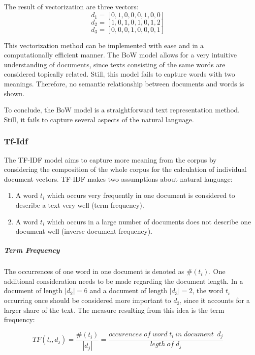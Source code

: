             The result of vectorization are three vectors:
            \[ d_{1} = [0,1,0,0,0,1,0,0] \]
            \[ d_{2} = [1,0,1,0,1,0,1,2] \]	
            \[ d_{3} = [0,0,0,1,0,0,0,1]\]
    
    
            This vectorization method can be implemented with ease and in a computationally efficient manner. The \ac{BoW} model allows for a very intuitive understanding of documents, since texts consisting of the same words are considered topically related. Still, this model fails to capture words with two meanings. Therefore, no semantic relationship between documents and words is shown.
            
            To conclude, the \ac{BoW} model is a straightforward text representation method. Still, it fails to capture several aspects of the natural language.
            
            \subsubsection{Tf-Idf}
            The \ac{TF-IDF} model aims to capture more meaning from the corpus by considering the composition of the whole corpus for the calculation of individual document vectors. \ac{TF-IDF} makes two assumptions about natural language:
            \begin{enumerate}
            	\item A word $t_{i} $ which occurs very frequently in one document is considered to describe a text very well (term frequency).
            	\item A word $t_{i} $ which occurs in a large number of documents does not describe one document well (inverse document frequency).
            \end{enumerate}
            
            \subparagraph{Term Frequency}
            The occurrences of one word in one document is denoted as $ \#( t_{i}) $.
            One additional consideration needs to be made regarding the document length. In a document of length $ |d_{2}| = 6 $ and a document of length  $ |d_{3}| = 2 $, the word $ t_{i} $occurring once should be considered more important to $ d_{3} $, since it accounts for a larger share of the text. The measure resulting from this idea is the term frequency:
            
            \[ TF(t_{i}, d_{j}) =   \dfrac{\#( t_{i})}{|d_{j}|} = \dfrac{occurences \; of \; word \; t_{i} \: in \; document \;\:   d_{j}}{legth \; of \; d_{j}} \]
            
